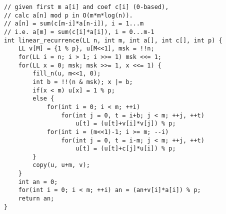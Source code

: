 \begin{lstlisting}
// given first m a[i] and coef c[i] (0-based),
// calc a[n] mod p in O(m*m*log(n)).
// a[n] = sum(c[m-i]*a[n-i]), i = 1...m
// i.e. a[m] = sum(c[i]*a[i]), i = 0...m-1
int linear_recurrence(LL n, int m, int a[], int c[], int p) {
	LL v[M] = {1 % p}, u[M<<1], msk = !!n;
	for(LL i = n; i > 1; i >>= 1) msk <<= 1;
	for(LL x = 0; msk; msk >>= 1, x <<= 1) {
		fill_n(u, m<<1, 0);
		int b = !!(n & msk); x |= b;
		if(x < m) u[x] = 1 % p;
		else {
			for(int i = 0; i < m; ++i)
				for(int j = 0, t = i+b; j < m; ++j, ++t)
					u[t] = (u[t]+v[i]*v[j]) % p;
			for(int i = (m<<1)-1; i >= m; --i)
				for(int j = 0, t = i-m; j < m; ++j, ++t)
					u[t] = (u[t]+c[j]*u[i]) % p;
		}
		copy(u, u+m, v);
	}
	int an = 0;
	for(int i = 0; i < m; ++i) an = (an+v[i]*a[i]) % p;
	return an;
}
\end{lstlisting}
